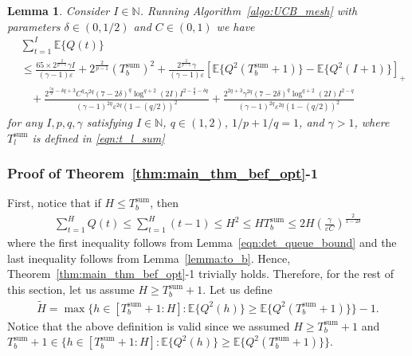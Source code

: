 \documentclass[12pt,draftcls, onecolumn]{IEEEtran}
\newtheorem{lemma}{Lemma}
\begin{document}
\begin{lemma}\label{lemma:unifying_lemma}
    Consider $I \in \mathbb{N}$. Running Algorithm~\ref{algo:UCB_mesh} with parameters $\delta \in (0,1/2)$ and $C \in (0,1)$ we have
    \begin{align}
        &\sum_{t=1}^{I} \mathbb{E}\{Q(t)\}   \nonumber\\&\leq \frac{65\times 2^{\frac{2}{p-1}}\gamma I}{(\gamma-1) \varepsilon}+2^{\frac{2}{p-1}}(T_b^{\text{sum}})^2+\frac{2^{\frac{2}{p-1}}\gamma}{(\gamma-1)\varepsilon}\left[\mathbb{E}\{Q^2(T^{\text{sum}}_b+1)\}-\mathbb{E}\{Q^2( I+1)\}\right]_+ \nonumber\\&\ \ \ \  +\frac{2^{\frac{5q}{2}-\delta q+3}C^q\gamma^{2q}(7-2\delta)^q \log^{q+2}(2I)I^{2-\frac{q}{2}-\delta q}}{(\gamma-1)^{2q}\varepsilon^{2q}(1-(q/2))^2} +\frac{2^{2q+3}\gamma^{2q}(7-2\delta)^q \log^{q+2}(2I)I^{2-q}}{(\gamma-1)^{2q}\varepsilon^{2q}(1-(q/2))^2} \nonumber
    \end{align}
    for any $I, p,q,\gamma$ satisfying $I \in \mathbb{N}$, $q \in (1,2)$, $1/p+1/q = 1$, and $\gamma >1$, where $T_l^{\text{sum}}$ is defined in \eqref{eqn:t_l_sum}
\end{lemma}
\subsubsection{Proof of Theorem~\ref{thm:main_thm_bef_opt}-1}\label{sec:main_thm_1}
First, notice that if $H \leq T^{\text{sum}}_b$, then
\begin{align}
    \sum_{t=1}^H Q(t) \leq \sum_{t=1}^H(t-1) \leq H^2 \leq HT^{\text{sum}}_b \leq  2H\left(\frac{\gamma}{\varepsilon C}\right)^{\frac{2}{1-2\delta}} \nonumber
\end{align}
where the first inequality follows from Lemma~\ref{eqn:det_queue_bound} and the last inequality follows from Lemma~\ref{lemma:to_b}.
Hence, Theorem~\ref{thm:main_thm_bef_opt}-1 trivially holds. Therefore, for the rest of this section, let us assume $H \geq T^{\text{sum}}_b+1$. Let us define 
\begin{align}\label{eqn:til_H_def}
    \tilde{H} = \max\{h \in [T^{\text{sum}}_b+1:H]:\mathbb{E}\{Q^2(h)\} \geq \mathbb{E}\{Q^2(T^{\text{sum}}_b+1)\}   \}-1.
\end{align}
Notice that the above definition is valid since we assumed $H \geq T^{\text{sum}}_b+1$ and $T^{\text{sum}}_b+1 \in \{h \in [T^{\text{sum}}_b+1:H]:\mathbb{E}\{Q^2(h)\} \geq \mathbb{E}\{Q^2(T^{\text{sum}}_b+1)\} \}$.  
\end{document}
